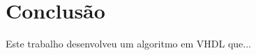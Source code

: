 \documentclass[12pt]{article}
\begin{document}
\section{Conclus\~ao}\label{sec:figs}

Este trabalho desenvolveu um algoritmo em VHDL que...









\end{document}
